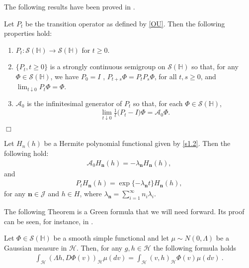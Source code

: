 \documentclass[review, onefignum, onetabnum]{siamart171218}
\begin{document}
The following results have been proved in \cite{liu}.
\begin{lemma}
    Let $P_t$ be the transition operator as defined by \eqref{OU}. Then
    the following properties hold:
    \begin{enumerate}
     \item
        $P_t : \mathcal{S}(\mathbb{H})\rightarrow  \mathcal{S}(\mathbb{H})$
        for $t \ge 0$.
    \item
        $\{P_t , t \ge 0\}$
        is a strongly continuous semigroup on
        $\mathcal{S}(\mathbb{H})$ so that, for any
        $\Phi \in \mathcal{S}(\mathbb{H})$, we have $P_0 = I$ ,
        $P_{t+s} \Phi = P_t P_s \Phi$, for all $t, s \ge 0$, and
        $\lim_{t\downarrow 0}
        P_t \Phi = \Phi$.
    \item
        $\mathcal{A}_0$ is the infinitesimal generator of $P_t$ so that, for
        each $\Phi\in\mathcal{S}(\mathbb{H})$,
        \[
            \lim_{t\downarrow 0} \tfrac{1}{t}\big(P_t- I\big)\Phi
                = \mathcal{A}_0\Phi.
        \]
    \end{enumerate}
    \hfill $\Box$
\end{lemma}

\begin{lemma}\label{Pt-Her}
        Let $H_n(h)$ be a Hermite polynomial functional given by \eqref{s1.2}.
        Then the following hold:
    \begin{align}
        \mathcal{A}_0 H_{\mathbf{n}}(h) =
        -\lambda_{\mathbf{n}} H_{\mathbf{n}}(h),
    \end{align}
    and
    \begin{align}
        P_t H_{\mathbf{n}} (h)
        = \exp\{-\lambda_{\mathbf{n}} t\} H_{\mathbf{n}} (h),
    \end{align}
    for any $\mathbf{n}\in\mathcal{J}$ and $h \in H$, where
    $
        \displaystyle
        \lambda_{\mathbf{n}}=\sum_{i=1}^\infty n_i\lambda_i.
    $
\end{lemma}

The following Theorem is a Green formula that we will need forward.
Its proof can be seen, for instance, in \cite[Thm. 3.3, Ch. 9,][]{liu}.

\begin{theorem}\label{green-form}
    Let
    $
        \Phi \in \mathcal{S}(\mathbb{H})
    $ be a smooth simple functional and let
    $\mu\sim N(0,\Lambda)$ be a Gaussian measure in $\mathcal{H}$. Then,
    for any $g,h\in\mathcal{H}$ the following formula holds
    \begin{align}
        \int_{\mathcal{H}} (\Lambda h,D\Phi(v))_{\mathcal{H}}  \mu(dv) =
            \int_{\mathcal{H}} (v,h)_{\mathcal{H}}
            \Phi(v) \mu(dv) \ .
            \label{s2.2.1}
    \end{align}

\end{theorem}
\end{document}
